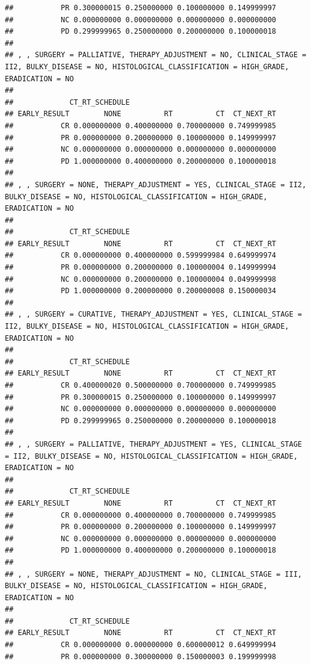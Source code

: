 \documentclass[]{article}
\begin{document}
\begin{verbatim}
##           PR 0.300000015 0.250000000 0.100000000 0.149999997
##           NC 0.000000000 0.000000000 0.000000000 0.000000000
##           PD 0.299999965 0.250000000 0.200000000 0.100000018
## 
## , , SURGERY = PALLIATIVE, THERAPY_ADJUSTMENT = NO, CLINICAL_STAGE = II2, BULKY_DISEASE = NO, HISTOLOGICAL_CLASSIFICATION = HIGH_GRADE, ERADICATION = NO
## 
##             CT_RT_SCHEDULE
## EARLY_RESULT        NONE          RT          CT  CT_NEXT_RT
##           CR 0.000000000 0.400000000 0.700000000 0.749999985
##           PR 0.000000000 0.200000000 0.100000000 0.149999997
##           NC 0.000000000 0.000000000 0.000000000 0.000000000
##           PD 1.000000000 0.400000000 0.200000000 0.100000018
## 
## , , SURGERY = NONE, THERAPY_ADJUSTMENT = YES, CLINICAL_STAGE = II2, BULKY_DISEASE = NO, HISTOLOGICAL_CLASSIFICATION = HIGH_GRADE, ERADICATION = NO
## 
##             CT_RT_SCHEDULE
## EARLY_RESULT        NONE          RT          CT  CT_NEXT_RT
##           CR 0.000000000 0.400000000 0.599999984 0.649999974
##           PR 0.000000000 0.200000000 0.100000004 0.149999994
##           NC 0.000000000 0.200000000 0.100000004 0.049999998
##           PD 1.000000000 0.200000000 0.200000008 0.150000034
## 
## , , SURGERY = CURATIVE, THERAPY_ADJUSTMENT = YES, CLINICAL_STAGE = II2, BULKY_DISEASE = NO, HISTOLOGICAL_CLASSIFICATION = HIGH_GRADE, ERADICATION = NO
## 
##             CT_RT_SCHEDULE
## EARLY_RESULT        NONE          RT          CT  CT_NEXT_RT
##           CR 0.400000020 0.500000000 0.700000000 0.749999985
##           PR 0.300000015 0.250000000 0.100000000 0.149999997
##           NC 0.000000000 0.000000000 0.000000000 0.000000000
##           PD 0.299999965 0.250000000 0.200000000 0.100000018
## 
## , , SURGERY = PALLIATIVE, THERAPY_ADJUSTMENT = YES, CLINICAL_STAGE = II2, BULKY_DISEASE = NO, HISTOLOGICAL_CLASSIFICATION = HIGH_GRADE, ERADICATION = NO
## 
##             CT_RT_SCHEDULE
## EARLY_RESULT        NONE          RT          CT  CT_NEXT_RT
##           CR 0.000000000 0.400000000 0.700000000 0.749999985
##           PR 0.000000000 0.200000000 0.100000000 0.149999997
##           NC 0.000000000 0.000000000 0.000000000 0.000000000
##           PD 1.000000000 0.400000000 0.200000000 0.100000018
## 
## , , SURGERY = NONE, THERAPY_ADJUSTMENT = NO, CLINICAL_STAGE = III, BULKY_DISEASE = NO, HISTOLOGICAL_CLASSIFICATION = HIGH_GRADE, ERADICATION = NO
## 
##             CT_RT_SCHEDULE
## EARLY_RESULT        NONE          RT          CT  CT_NEXT_RT
##           CR 0.000000000 0.000000000 0.600000012 0.649999994
##           PR 0.000000000 0.300000000 0.150000003 0.199999998

\end{verbatim}
\end{document}
